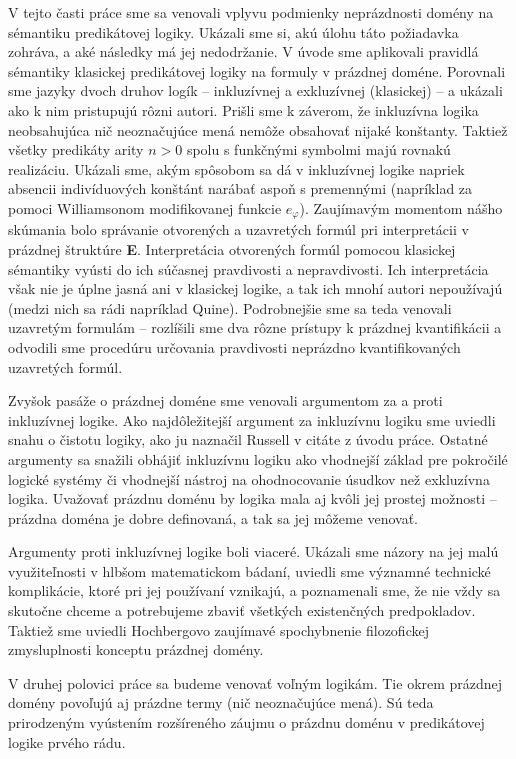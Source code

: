 \documentclass[12pt, letterpaper]{article}
\begin{document}
V tejto časti práce sme sa venovali vplyvu podmienky neprázdnosti domény na sémantiku predikátovej logiky. Ukázali sme si, akú úlohu táto požiadavka zohráva, a aké následky má jej nedodržanie. V úvode sme aplikovali pravidlá sémantiky klasickej predikátovej logiky na formuly v prázdnej doméne. Porovnali sme jazyky dvoch druhov logík -- inkluzívnej a exkluzívnej (klasickej) -- a ukázali ako k nim pristupujú rôzni autori. Prišli sme k záverom, že inkluzívna logika neobsahujúca nič neoznačujúce mená nemôže obsahovať nijaké konštanty. Taktiež všetky predikáty arity $n > 0$ spolu s funkčnými symbolmi majú rovnakú realizáciu. Ukázali sme, akým spôsobom sa dá v inkluzívnej logike napriek absencii indivíduových konštánt narábať aspoň s premennými (napríklad za pomoci Williamsonom modifikovanej funkcie $e_\varphi$). Zaujímavým momentom nášho skúmania bolo správanie otvorených a uzavretých formúl pri interpretácii v prázdnej štruktúre \textbf{E}. Interpretácia otvorených formúl pomocou klasickej sémantiky vyústi do ich súčasnej pravdivosti a nepravdivosti. Ich interpretácia však nie je úplne jasná ani v klasickej logike, a tak ich mnohí autori nepoužívajú (medzi nich sa rádi napríklad Quine). Podrobnejšie sme sa teda venovali uzavretým formulám -- rozlíšili sme dva rôzne prístupy k prázdnej kvantifikácii a odvodili sme procedúru určovania pravdivosti neprázdno kvantifikovaných uzavretých formúl.\par
Zvyšok pasáže o prázdnej doméne sme venovali argumentom za a proti inkluzívnej logike. Ako najdôležitejší argument za inkluzívnu logiku sme uviedli snahu o čistotu logiky, ako ju naznačil Russell v citáte z úvodu práce. Ostatné argumenty sa snažili obhájiť inkluzívnu logiku ako vhodnejší základ pre pokročilé logické systémy či vhodnejší nástroj na ohodnocovanie úsudkov než exkluzívna logika. Uvažovať prázdnu doménu by logika mala aj kvôli jej prostej možnosti -- prázdna doména je dobre definovaná, a tak sa jej môžeme venovať.\par
Argumenty proti inkluzívnej logike boli viaceré. Ukázali sme názory na jej malú využiteľnosti v hlbšom matematickom bádaní, uviedli sme významné technické komplikácie, ktoré pri jej používaní vznikajú, a poznamenali sme, že nie vždy sa skutočne chceme a potrebujeme zbaviť všetkých existenčných predpokladov. Taktiež sme uviedli Hochbergovo zaujímavé spochybnenie filozofickej zmysluplnosti konceptu prázdnej domény.\par
V druhej polovici práce sa budeme venovať voľným logikám. Tie okrem prázdnej domény povoľujú aj prázdne termy (nič neoznačujúce mená). Sú teda prirodzeným vyústením rozšíreného záujmu o prázdnu doménu v predikátovej logike prvého rádu.
\end{document}

